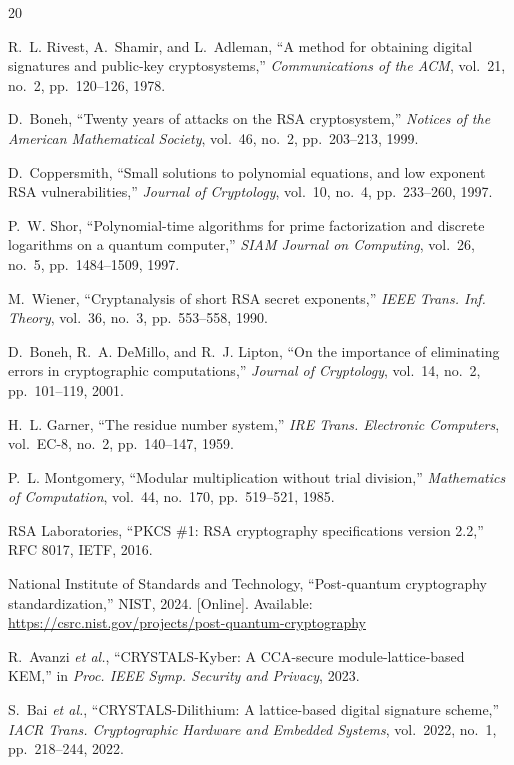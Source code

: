 \documentclass[conference]{IEEEtran}
\begin{document}

\begin{thebibliography}{20}

R.~L. Rivest, A.~Shamir, and L.~Adleman, ``A method for obtaining digital signatures and public-key cryptosystems,'' \textit{Communications of the ACM}, vol.~21, no.~2, pp.~120--126, 1978.

D.~Boneh, ``Twenty years of attacks on the RSA cryptosystem,'' \textit{Notices of the American Mathematical Society}, vol.~46, no.~2, pp.~203--213, 1999.

D.~Coppersmith, ``Small solutions to polynomial equations, and low exponent RSA vulnerabilities,'' \textit{Journal of Cryptology}, vol.~10, no.~4, pp.~233--260, 1997.

P.~W. Shor, ``Polynomial-time algorithms for prime factorization and discrete logarithms on a quantum computer,'' \textit{SIAM Journal on Computing}, vol.~26, no.~5, pp.~1484--1509, 1997.

M.~Wiener, ``Cryptanalysis of short RSA secret exponents,'' \textit{IEEE Trans. Inf. Theory}, vol.~36, no.~3, pp.~553--558, 1990.

D.~Boneh, R.~A. DeMillo, and R.~J. Lipton, ``On the importance of eliminating errors in cryptographic computations,'' \textit{Journal of Cryptology}, vol.~14, no.~2, pp.~101--119, 2001.

H.~L. Garner, ``The residue number system,'' \textit{IRE Trans. Electronic Computers}, vol.~EC-8, no.~2, pp.~140--147, 1959.

P.~L. Montgomery, ``Modular multiplication without trial division,'' \textit{Mathematics of Computation}, vol.~44, no.~170, pp.~519--521, 1985.

RSA Laboratories, ``PKCS \#1: RSA cryptography specifications version 2.2,'' RFC 8017, IETF, 2016.

National Institute of Standards and Technology, ``Post-quantum cryptography standardization,'' NIST, 2024. [Online]. Available: \url{https://csrc.nist.gov/projects/post-quantum-cryptography}

R.~Avanzi \textit{et al.}, ``CRYSTALS-Kyber: A CCA-secure module-lattice-based KEM,'' in \textit{Proc. IEEE Symp. Security and Privacy}, 2023.

S.~Bai \textit{et al.}, ``CRYSTALS-Dilithium: A lattice-based digital signature scheme,'' \textit{IACR Trans. Cryptographic Hardware and Embedded Systems}, vol.~2022, no.~1, pp.~218--244, 2022.


\end{thebibliography}
\end{document}
